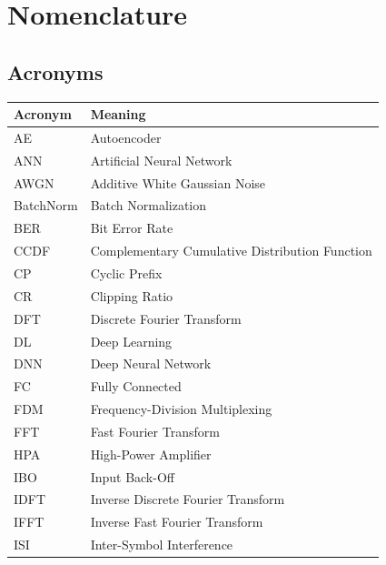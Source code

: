\chapter*{Nomenclature}
\label{ch:nomenclature}

\section*{Acronyms}

\begin{center}
\begin{tabular}{l l}
\toprule
    \textbf{Acronym} & \textbf{Meaning} \\
\midrule
AE      & Autoencoder \\
ANN     & Artificial Neural Network \\
AWGN    & Additive White Gaussian Noise \\
BatchNorm & Batch Normalization \\
BER     & Bit Error Rate \\
CCDF    & Complementary Cumulative Distribution Function \\
CP      & Cyclic Prefix \\
CR      & Clipping Ratio \\
DFT     & Discrete Fourier Transform \\
DL      & Deep Learning \\
DNN     & Deep Neural Network \\
FC      & Fully Connected \\
FDM     & Frequency-Division Multiplexing \\
FFT     & Fast Fourier Transform \\
HPA     & High-Power Amplifier \\
IBO     & Input Back-Off \\
IDFT    & Inverse Discrete Fourier Transform \\
IFFT    & Inverse Fast Fourier Transform \\
ISI     & Inter-Symbol Interference \\
\bottomrule
\end{tabular}


\end{center}
